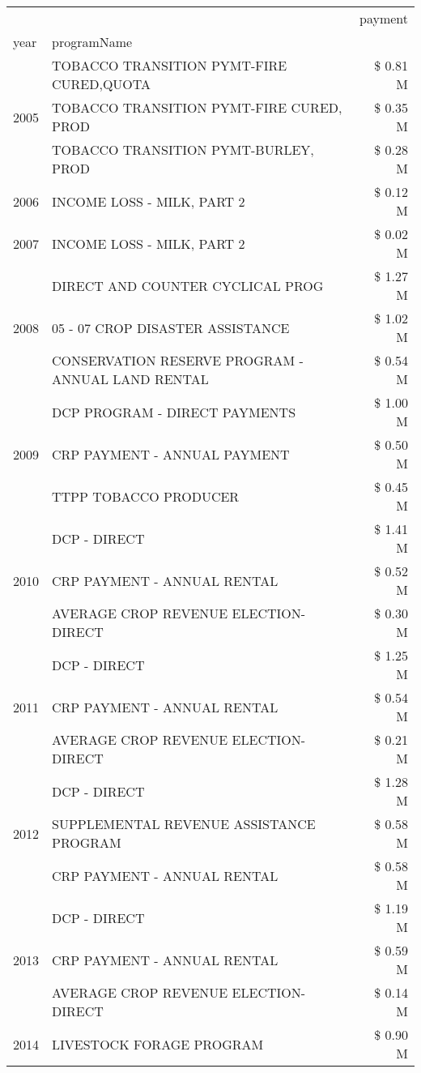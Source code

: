 \begin{tabular}{llr}
\toprule
 &  & payment \\
year & programName &  \\
\midrule
\multirow[t]{3}{*}{2005} & TOBACCO TRANSITION PYMT-FIRE CURED,QUOTA & \$ 0.81 M \\
 & TOBACCO TRANSITION PYMT-FIRE CURED, PROD & \$ 0.35 M \\
 & TOBACCO TRANSITION PYMT-BURLEY, PROD & \$ 0.28 M \\
\cline{1-3}
2006 & INCOME LOSS - MILK, PART 2 & \$ 0.12 M \\
\cline{1-3}
2007 & INCOME LOSS - MILK, PART 2 & \$ 0.02 M \\
\cline{1-3}
\multirow[t]{3}{*}{2008} & DIRECT AND COUNTER CYCLICAL PROG & \$ 1.27 M \\
 & 05 - 07 CROP DISASTER ASSISTANCE & \$ 1.02 M \\
 & CONSERVATION RESERVE PROGRAM - ANNUAL LAND RENTAL & \$ 0.54 M \\
\cline{1-3}
\multirow[t]{3}{*}{2009} & DCP PROGRAM - DIRECT PAYMENTS & \$ 1.00 M \\
 & CRP PAYMENT - ANNUAL PAYMENT & \$ 0.50 M \\
 & TTPP TOBACCO PRODUCER & \$ 0.45 M \\
\cline{1-3}
\multirow[t]{3}{*}{2010} & DCP - DIRECT & \$ 1.41 M \\
 & CRP PAYMENT - ANNUAL RENTAL & \$ 0.52 M \\
 & AVERAGE CROP REVENUE ELECTION-DIRECT & \$ 0.30 M \\
\cline{1-3}
\multirow[t]{3}{*}{2011} & DCP - DIRECT & \$ 1.25 M \\
 & CRP PAYMENT - ANNUAL RENTAL & \$ 0.54 M \\
 & AVERAGE CROP REVENUE ELECTION-DIRECT & \$ 0.21 M \\
\cline{1-3}
\multirow[t]{3}{*}{2012} & DCP - DIRECT & \$ 1.28 M \\
 & SUPPLEMENTAL REVENUE ASSISTANCE PROGRAM & \$ 0.58 M \\
 & CRP PAYMENT - ANNUAL RENTAL & \$ 0.58 M \\
\cline{1-3}
\multirow[t]{3}{*}{2013} & DCP - DIRECT & \$ 1.19 M \\
 & CRP PAYMENT - ANNUAL RENTAL & \$ 0.59 M \\
 & AVERAGE CROP REVENUE ELECTION-DIRECT & \$ 0.14 M \\
\cline{1-3}
\multirow[t]{3}{*}{2014} & LIVESTOCK FORAGE PROGRAM & \$ 0.90 M \\

\end{tabular}
